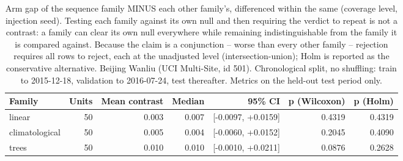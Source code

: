 \begin{table}[htbp]
\caption{Arm gap of the sequence family MINUS each other family's, differenced within the same (coverage level, injection seed). Testing each family against its own null and then requiring the verdict to repeat is not a contrast: a family can clear its own null everywhere while remaining indistinguishable from the family it is compared against. Because the claim is a conjunction -- worse than every other family -- rejection requires all rows to reject, each at the unadjusted level (intersection-union); Holm is reported as the conservative alternative. Beijing Wanliu (UCI Multi-Site, id 501). Chronological split, no shuffling: train to 2015-12-18, validation to 2016-07-24, test thereafter. Metrics on the held-out test period only.}
\label{tab:ablation_family_contrasts}
\begin{tabular}{lrrrrrr}
\toprule
Family & Units & Mean contrast & Median & 95\% CI & p (Wilcoxon) & p (Holm) \\
\midrule
linear & 50 & 0.003 & 0.007 & [-0.0097, +0.0159] & 0.4319 & 0.4319 \\
climatological & 50 & 0.005 & 0.004 & [-0.0060, +0.0152] & 0.2045 & 0.4090 \\
trees & 50 & 0.010 & 0.010 & [-0.0010, +0.0211] & 0.0876 & 0.2628 \\
\bottomrule
\end{tabular}
\end{table}

